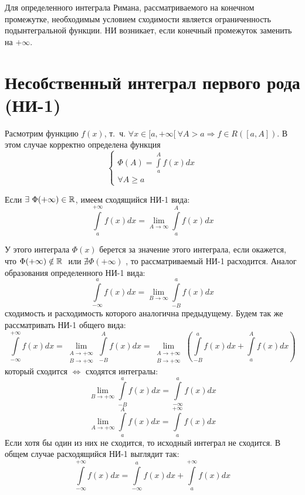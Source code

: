 \documentclass[../../main.tex]{subfiles}
\begin{document}
Для определенного интеграла Римана, рассматриваемого на конечном промежутке,
необходимым условием сходимости является ограниченность подынтегральной функции.
НИ возникает, если конечный промежуток заменить на $+\infty$.

\section{Несобственный интеграл первого рода (НИ-1)}

Расмотрим функцию $f(x)$, т.~ч.
$\forall x \in [a, +\infty[ \ \forall A > a \Longrightarrow f \in R([a, A])$.
В этом случае корректно определена функция
\begin{equation}
    \label{7:1}
    \begin{cases}
        \Phi(A) = \int\limits_a^A f(x)dx\\
        \forall A \geq a
    \end{cases}
\end{equation}

Если $\exists \ \Phi(+\infty) \in \mathbb{R}$, имеем сходящийся НИ-1 вида:
\begin{equation}
    \label{7:2}
    \int\limits_a^{+\infty} f(x)dx = \lim\limits_{A \to \infty} \int\limits_a^A f(x)dx
\end{equation}

У этого интеграла $\Phi(x)$ берется за значение этого интеграла, если окажется,
что $\Phi(+\infty) \\ \notin \mathbb{R} \ $ или $ \nexists \Phi(+\infty)$
, то рассматриваемый НИ-1 расходится.
Аналог образования определенного НИ-1 вида:
\[\int\limits_{-\infty}^a f(x)dx =
\lim\limits_{B \to \infty} \int\limits_{-B}^a f(x)dx \]
сходимость и расходимость которого аналогична предыдущему.
Будем так же рассматривать НИ-1 общего вида:
\[ \int\limits_{-\infty}^{+\infty} f(x)dx =
\lim\limits_{\substack{A \to +\infty \\ B \to +\infty}}
\int\limits_{-B}^A f(x)dx =
\lim\limits_{\substack{A \to +\infty \\ B \to +\infty}}
\left( \int\limits_{-B}^a f(x)dx + \int\limits_a^{A} f(x)dx \right) \]
который сходится $\iff$ сходятся интегралы:
\[ \lim\limits_{B \to +\infty} \int\limits_{-B}^a f(x)dx
= \int\limits_{-\infty}^a f(x)dx \]
\[\lim\limits_{A \to +\infty} \int\limits_a^{A} f(x)dx
= \int\limits_a^{+\infty} f(x)dx \]
Если хотя бы один из них не сходится, то исходный интеграл не сходится.
В общем случае расходящийся НИ-1 выглядит так:
\[ \int\limits_{-\infty}^{+\infty} f(x)dx  = \int\limits_{-\infty}^a f(x)dx
+ \int\limits_a^{+\infty} f(x)dx\]
\end{document}
